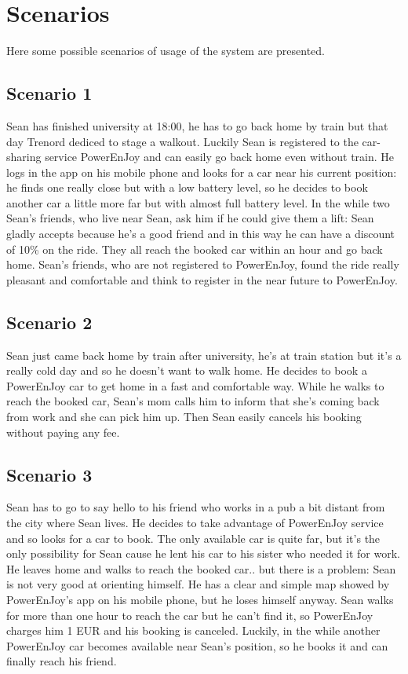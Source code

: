\section{Scenarios}
Here some possible scenarios of usage of the system are presented.

\subsection{Scenario 1}
Sean has finished university at 18:00, he has to go back home by train but that day Trenord dediced to stage a walkout. Luckily Sean is registered to the car-sharing service PowerEnJoy and can easily go back home even without train. 
He logs in the app on his mobile phone and looks for a car near his current position: he finds one really close but with a low battery level, so he decides to book another car a little more far but with almost full battery level.
In the while two Sean’s friends, who live near Sean, ask him if he could give them a lift: Sean gladly accepts because he’s a good friend and in this way he can have a discount of 10\% on the ride.
They all reach the booked car within an hour and go back home. 
Sean’s friends, who are not registered to PowerEnJoy, found the ride really pleasant and comfortable and think to register in the near future to PowerEnJoy.


\subsection{Scenario 2}
Sean just came back home by train after university, he’s at train station but it’s a really cold day and so he doesn’t want to walk home. He decides to book a PowerEnJoy car to get home in a fast and comfortable way.
While he walks to reach the booked car, Sean’s mom calls him to inform that she’s coming back from work and she can pick him up.
Then Sean easily cancels his booking without paying any fee.


\subsection{Scenario 3}
Sean has to go to say hello to his friend who works in a pub a bit distant from the city where Sean lives. He decides to take advantage of PowerEnJoy service and so looks for a car to book.
The only available car is quite far, but it’s the only possibility for Sean cause he lent his car to his sister who needed it for work.
He leaves home and walks to reach the booked car.. but there is a problem: Sean is not very good at orienting himself. He has a clear and simple map showed by PowerEnJoy’s app on his mobile phone, but he loses himself anyway.
Sean walks for more than one hour to reach the car but he can’t find it, so PowerEnJoy charges him 1 EUR and his booking is canceled.
Luckily, in the while another PowerEnJoy car becomes available near Sean’s position, so he books it and can finally reach his friend.


